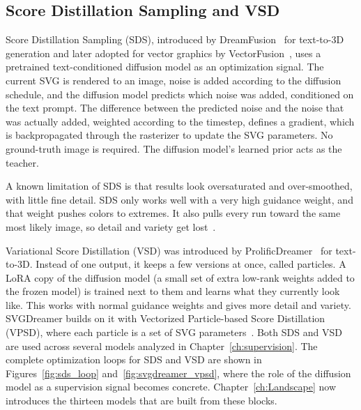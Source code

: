 \subsection{Score Distillation Sampling and VSD}
\label{sec:sds_vsd}
Score Distillation Sampling (SDS), introduced by 
DreamFusion~\cite{pooleDreamFusionTextto3DUsing2022} for 
text-to-3D generation and later adopted for vector 
graphics by VectorFusion~\cite{jainVectorFusionTexttoSVGAbstracting2022}, 
uses a pretrained text-conditioned diffusion model as an 
optimization signal. The current SVG is rendered to an 
image, noise is added according to the diffusion schedule, 
and the diffusion model predicts which noise was added, 
conditioned on the text prompt. The difference between 
the predicted noise and the noise that was actually added, 
weighted according to the timestep, defines a 
gradient, which is backpropagated through the rasterizer 
to update the SVG parameters. No ground-truth image is 
required. The diffusion model's learned prior acts as 
the teacher.

A known limitation of SDS is that results look oversaturated 
and over-smoothed, with little fine detail. SDS only works 
well with a very high guidance weight, and that weight pushes 
colors to extremes. It also pulls every run toward the same 
most likely image, so detail and variety get 
lost~\cite{pooleDreamFusionTextto3DUsing2022, wangProlificDreamerHighFidelityDiverse2023}.

Variational Score Distillation (VSD) was introduced by 
ProlificDreamer~\cite{wangProlificDreamerHighFidelityDiverse2023} 
for text-to-3D. Instead of one output, it keeps a few versions 
at once, called particles. A LoRA copy of the diffusion model 
(a small set of extra low-rank weights added to the frozen model) 
is trained next to them and learns what they currently look 
like. This works with normal guidance weights and gives more 
detail and variety. SVGDreamer builds on it with Vectorized 
Particle-based Score Distillation (VPSD), where each particle 
is a set of SVG parameters~\cite{xingSVGDreamerTextGuided2024}. Both SDS and VSD are used across several models analyzed 
in Chapter~\ref{ch:supervision}. The complete optimization 
loops for SDS and VSD are shown in 
Figures~\ref{fig:sds_loop} and~\ref{fig:svgdreamer_vpsd}, 
where the role of the diffusion model as a supervision 
signal becomes concrete. Chapter~\ref{ch:Landscape} now 
introduces the thirteen models that are built from these 
blocks.



